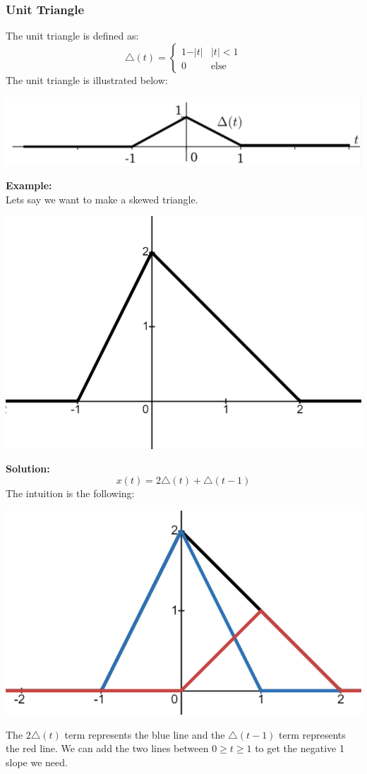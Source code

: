 \documentclass[10pt]{article}
\newcommand{\example}{\textbf{Example: }}
\begin{document}
\subsubsection*{Unit Triangle}
The unit triangle is defined as:
\[\triangle(t) = \begin{cases}1 - \vert t \vert & \vert t \vert < 1 \\ 0 & \text{else}\end{cases}\]
The unit triangle is illustrated below:
\begin{center}
    \includegraphics[scale=0.5]{W2_4.png}
\end{center}
\example\\
Lets say we want to make a skewed triangle.  
\begin{center}
    \includegraphics[scale=0.5]{W2_5.png}
\end{center}
\textbf{Solution:\\}
\[x(t) = 2\triangle(t) + \triangle(t - 1)\]
The intuition is the following:
\begin{center}
    \includegraphics[scale=0.5]{W2_6.png}
\end{center}
The $2\triangle(t)$ term represents the blue line and the $\triangle(t - 1)$ term represents the red line.  We can add the two lines between $0 \geq t \geq 1$ to get the negative 1 slope we need.
\end{document}
